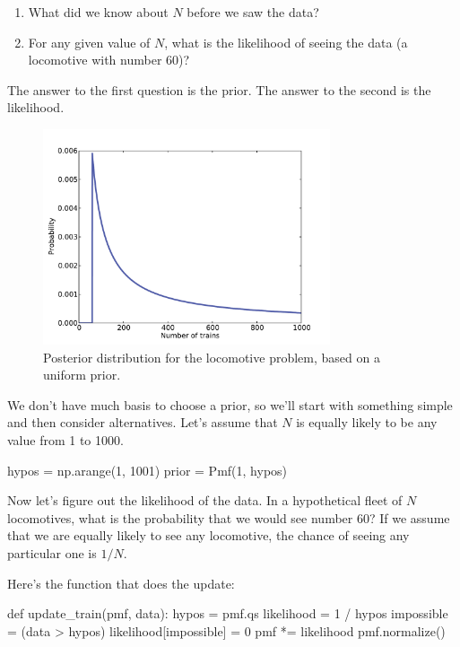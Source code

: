 \documentclass[12pt]{book}
\theoremstyle{exercise}
\begin{document}
\begin{enumerate}

\item What did we know about $N$ before we saw the data?

\item For any given value of $N$, what is the likelihood of
seeing the data (a locomotive with number 60)?

\end{enumerate}

The answer to the first question is the prior.  The answer to the
second is the likelihood.

\begin{figure}
\centerline{\includegraphics[height=2.5in]{figs/train1.pdf}}
\caption{Posterior distribution for the locomotive problem, based
on a uniform prior.}
\label{fig.train1}
\end{figure}

We don't have much basis to choose a prior, so we'll start with
something simple and then consider alternatives.  
Let's assume that $N$ is equally likely to be any value from 1 to 1000.

\begin{code}
hypos = np.arange(1, 1001)
prior = Pmf(1, hypos)
\end{code}

Now let's figure out the likelihood of the data.
In a hypothetical fleet of $N$ locomotives, what is the probability that we would see number 60?
If we assume that we are equally likely to see any locomotive, the chance of seeing any particular one is $1/N$.

Here's the function that does the update:

\begin{code}
def update_train(pmf, data):
    hypos = pmf.qs
    likelihood = 1 / hypos
    impossible = (data > hypos)
    likelihood[impossible] = 0
    pmf *= likelihood
    pmf.normalize()
\end{code}
\end{document}
